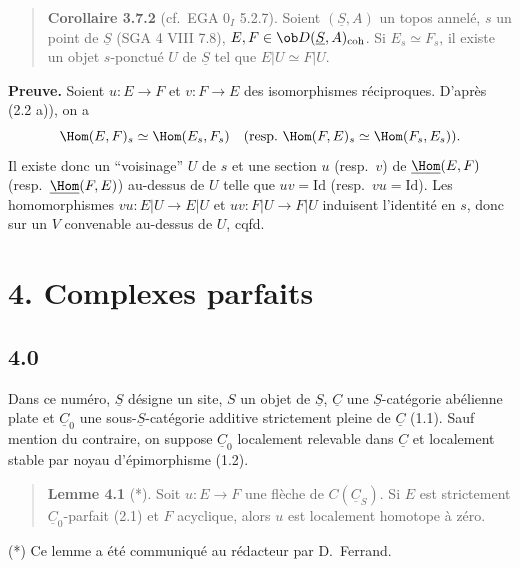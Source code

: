 \begin{quote}
\textbf{Corollaire 3.7.2} (cf.\ EGA $0_I$ 5.2.7). Soient $(\underline{S}, A)$ un topos annelé, $s$ un point de $\underline{S}$ (SGA 4 VIII 7.8), $E, F \in \ob D(\underline{S}, A)_{\mathrm{coh}}$. Si $E_s \simeq F_s$, il existe un objet $s$-ponctué $U$ de $\underline{S}$ tel que $E|U \simeq F|U$.
\end{quote}

\textbf{Preuve.} Soient $u : E \to F$ et $v : F \to E$ des isomorphismes réciproques. D'après (2.2 a)), on a
\[
\Hom(E, F)_s \simeq \Hom(E_s, F_s) \quad (\text{resp.\ } \Hom(F, E)_s \simeq \Hom(F_s, E_s)).
\]
Il existe donc un ``voisinage'' $U$ de $s$ et une section $u$ (resp.\ $v$) de $\underline{\Hom}(E, F)$ (resp.\ $\underline{\Hom}(F, E)$) au-dessus de $U$ telle que $uv = \mathrm{Id}$ (resp.\ $vu = \mathrm{Id}$). Les homomorphismes $vu : E|U \to E|U$ et $uv : F|U \to F|U$ induisent l'identité en $s$, donc sur un $V$ convenable au-dessus de $U$, cqfd.

\section*{4. Complexes parfaits}

\subsection*{4.0}

Dans ce numéro, $\underline{S}$ désigne un site, $S$ un objet de $\underline{S}$, $\underline{C}$ une $\underline{S}$-catégorie abélienne plate et $\underline{C}_0$ une sous-$\underline{S}$-catégorie additive strictement pleine de $\underline{C}$ (1.1). Sauf mention du contraire, on suppose $\underline{C}_0$ localement relevable dans $\underline{C}$ et localement stable par noyau d'épimorphisme (1.2).

\begin{quote}
\textbf{Lemme 4.1} (*). Soit $u : E \to F$ une flèche de $C(\underline{C}_S)$. Si $E$ est strictement $\underline{C}_0$-parfait (2.1) et $F$ acyclique, alors $u$ est localement homotope à zéro.
\end{quote}

(*) Ce lemme a été communiqué au rédacteur par D.\ Ferrand.

